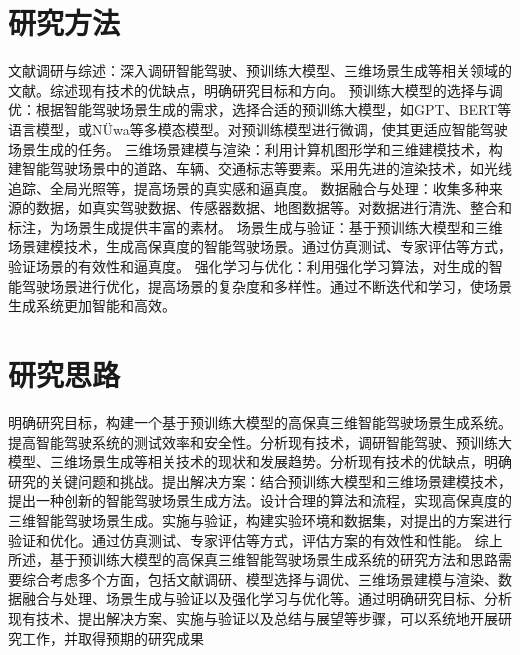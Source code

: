 \documentclass{article}
\begin{document}
\section{研究方法}
文献调研与综述：深入调研智能驾驶、预训练大模型、三维场景生成等相关领域的文献。综述现有技术的优缺点，明确研究目标和方向。
预训练大模型的选择与调优：根据智能驾驶场景生成的需求，选择合适的预训练大模型，如GPT、BERT等语言模型，或NÜwa等多模态模型。对预训练模型进行微调，使其更适应智能驾驶场景生成的任务。
三维场景建模与渲染：利用计算机图形学和三维建模技术，构建智能驾驶场景中的道路、车辆、交通标志等要素。采用先进的渲染技术，如光线追踪、全局光照等，提高场景的真实感和逼真度。
数据融合与处理：收集多种来源的数据，如真实驾驶数据、传感器数据、地图数据等。对数据进行清洗、整合和标注，为场景生成提供丰富的素材。
场景生成与验证：基于预训练大模型和三维场景建模技术，生成高保真度的智能驾驶场景。通过仿真测试、专家评估等方式，验证场景的有效性和逼真度。
强化学习与优化：利用强化学习算法，对生成的智能驾驶场景进行优化，提高场景的复杂度和多样性。通过不断迭代和学习，使场景生成系统更加智能和高效。
\section{研究思路}
明确研究目标，构建一个基于预训练大模型的高保真三维智能驾驶场景生成系统。提高智能驾驶系统的测试效率和安全性。分析现有技术，调研智能驾驶、预训练大模型、三维场景生成等相关技术的现状和发展趋势。分析现有技术的优缺点，明确研究的关键问题和挑战。提出解决方案：结合预训练大模型和三维场景建模技术，提出一种创新的智能驾驶场景生成方法。设计合理的算法和流程，实现高保真度的三维智能驾驶场景生成。实施与验证，构建实验环境和数据集，对提出的方案进行验证和优化。通过仿真测试、专家评估等方式，评估方案的有效性和性能。
综上所述，基于预训练大模型的高保真三维智能驾驶场景生成系统的研究方法和思路需要综合考虑多个方面，包括文献调研、模型选择与调优、三维场景建模与渲染、数据融合与处理、场景生成与验证以及强化学习与优化等。通过明确研究目标、分析现有技术、提出解决方案、实施与验证以及总结与展望等步骤，可以系统地开展研究工作，并取得预期的研究成果
\end{document}
